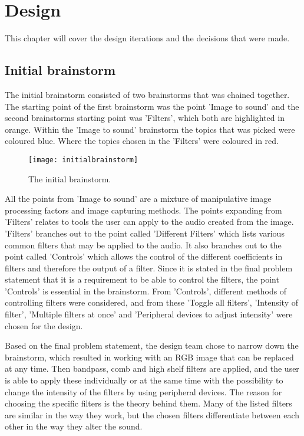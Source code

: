\chapter{Design}\label{ch:design}
This chapter will cover the design iterations and the decisions that were made. 

\section{Initial brainstorm}\label{sec:initialbrainstorm}
The initial brainstorm consisted of two brainstorms that was chained together. The starting point of the first brainstorm was the point 'Image to sound' and the second brainstorms starting point was 'Filters', which both are highlighted in orange. Within the 'Image to sound' brainstorm the topics that was picked were coloured blue. Where the topics chosen in the 'Filters' were coloured in red. 

\begin{figure}[!h] 
\centering
\texttt{[image: initialbrainstorm]}
\caption{\label{fig:initialbrainstorm} The initial brainstorm.}
\end{figure}

All the points from 'Image to sound' are a mixture of manipulative image processing factors and image capturing methods. 
The points expanding from 'Filters' relates to tools the user can apply to the audio created from the image. 
'Filters' branches out to the point called 'Different Filters' which lists various common filters that may be applied to the audio. It also branches out to the point called 'Controls' which allows the control of the different coefficients in filters and therefore the output of a filter. 
Since it is stated in the final problem statement that it is a requirement to be able to control the filters, the point 'Controls' is essential in the brainstorm. From 'Controls', different methods of controlling filters were considered, and from these 'Toggle all filters', 'Intensity of filter', 'Multiple filters at once' and 'Peripheral devices to adjust intensity' were chosen for the design.

Based on the final problem statement, the design team chose to narrow down the brainstorm, which resulted in working with an RGB image that can be replaced at any time. Then bandpass, comb and high shelf filters are applied, and the user is able to apply these individually or at the same time with the possibility to change the intensity of the filters by using peripheral devices. 
The reason for choosing the specific filters is the theory behind them. Many of the listed filters are similar in the way they work, but the chosen filters differentiate between each other in the way they alter the sound.


